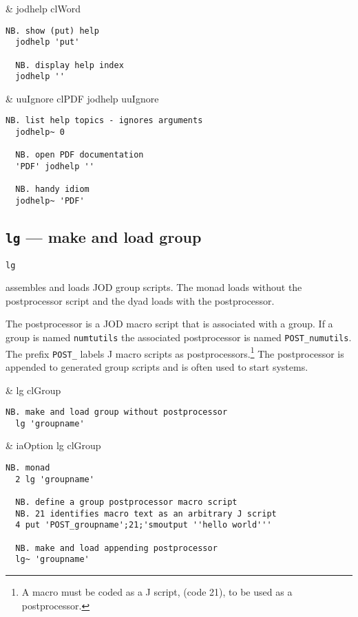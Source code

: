 \begin{wordhead}
\monad & jodhelp clWord \\
\end{wordhead}
\begin{lstlisting}[frame=single,framerule=0pt] 
  NB. show (put) help
  jodhelp 'put'   

  NB. display help index 
  jodhelp '' 
\end{lstlisting}  

\begin{wordhead}
\dyad & uuIgnore \argsep clPDF jodhelp uuIgnore 
\end{wordhead}
\begin{lstlisting}[frame=single,framerule=0pt] 
  NB. list help topics - ignores arguments 
  jodhelp~ 0    
  
  NB. open PDF documentation 
  'PDF' jodhelp ''
  
  NB. handy idiom
  jodhelp~ 'PDF'
\end{lstlisting}


\subsection{\texttt{lg} ---  make and load group}\label{ss:lg}

\hypertarget{il:lg}{\texttt{lg}} assembles 
and loads JOD group scripts.  The monad loads without the postprocessor 
script and the dyad loads with the postprocessor.

The postprocessor is a JOD macro script that is associated with a group.
If a group is named \texttt{numtutils} the associated postprocessor 
is named \verb|POST_numutils|. The prefix \verb|POST_| labels J macro scripts as postprocessors.\footnote{
A macro must be coded as a J script, (code 21), to be used as a postprocessor.
} The postprocessor is appended to generated group scripts and is often used to start systems.

\begin{wordhead}
\monad & lg clGroup \\
\end{wordhead}
\begin{lstlisting}[frame=single,framerule=0pt] 
  NB. make and load group without postprocessor 
  lg 'groupname'
\end{lstlisting}

\begin{wordhead}
\dyad & iaOption lg clGroup \\
\end{wordhead}
\begin{lstlisting}[frame=single,framerule=0pt] 
  NB. monad
  2 lg 'groupname' 

  NB. define a group postprocessor macro script
  NB. 21 identifies macro text as an arbitrary J script
  4 put 'POST_groupname';21;'smoutput ''hello world'''

  NB. make and load appending postprocessor
  lg~ 'groupname' 
\end{lstlisting}


